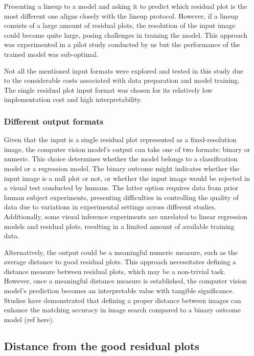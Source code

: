 \documentclass[]{interact}
\theoremstyle{plain}%
\theoremstyle{definition}
\theoremstyle{remark}
\begin{document}
Presenting a lineup to a model and asking it to predict which residual
plot is the most different one aligns closely with the lineup protocol.
However, if a lineup consists of a large amount of residual plots, the
resolution of the input image could become quite large, posing
challenges in training the model. This approach was experimented in a
pilot study conducted by us but the performance of the trained model was
sub-optimal.

Not all the mentioned input formats were explored and tested in this
study due to the considerable costs associated with data preparation and
model training. The single residual plot input format was chosen for its
relatively low implementation cost and high interpretability.

\hypertarget{different-output-formats}{%
\subsubsection{Different output
formats}\label{different-output-formats}}

Given that the input is a single residual plot represented as a
fixed-resolution image, the computer vision model's output can take one
of two formats: binary or numeric. This choice determines whether the
model belongs to a classification model or a regression model. The
binary outcome might indicates whether the input image is a null plot or
not, or whether the input image would be rejected in a visual test
conducted by humans. The latter option requires data from prior human
subject experiments, presenting difficulties in controlling the quality
of data due to variations in experimental settings across different
studies. Additionally, some visual inference experiments are unrelated
to linear regression models and residual plots, resulting in a limited
amount of available training data.

Alternatively, the output could be a meaningful numeric measure, such as
the average distance to good residual plots. This approach necessitates
defining a distance measure between residual plots, which may be a
non-trivial task. However, once a meaningful distance measure is
established, the computer vision model's prediction becomes an
interpretable value with tangible significance. Studies have
demonstrated that defining a proper distance between images can enhance
the matching accuracy in image search compared to a binary outcome model
(ref here).

\hypertarget{distance-from-the-good-residual-plots}{%
\subsection{Distance from the good residual
plots}\label{distance-from-the-good-residual-plots}}
\end{document}
